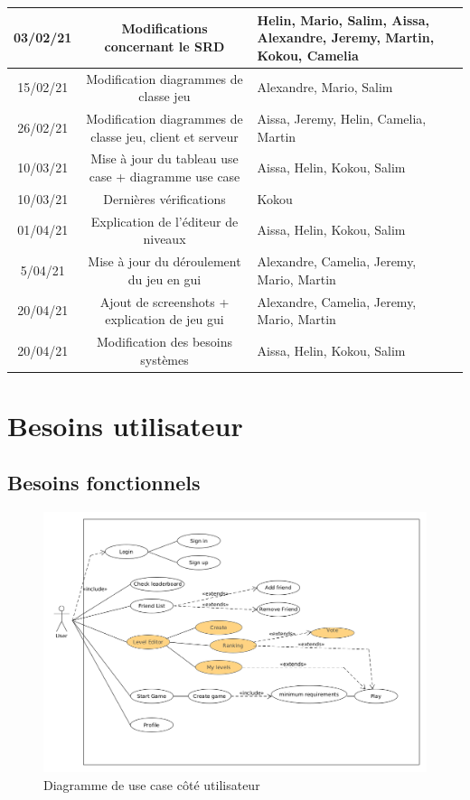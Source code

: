 \documentclass[a4paper,12pt]{article}
\begin{document}
\begin{tabularx}{16cm}{|c|c|X|}
	\hline
	    03/02/21 & Modifications concernant le SRD & Helin, Mario, Salim, Aissa,
		Alexandre, Jeremy, Martin, Kokou, Camelia\\
	\hline
	    15/02/21 & Modification diagrammes de classe jeu & Alexandre, Mario, Salim\\
	\hline
    	26/02/21 & Modification diagrammes de classe
	    jeu, client et serveur & Aissa, Jeremy, Helin, Camelia, Martin\\
	\hline
	    10/03/21 & Mise à jour du tableau use case + diagramme use case &  Aissa, Helin, Kokou, Salim\\
	\hline
	    10/03/21 & Dernières vérifications & Kokou\\
	\hline
	    01/04/21 & Explication de l'éditeur de niveaux & Aissa, Helin, Kokou, Salim\\
	\hline
	    5/04/21 & Mise à jour du déroulement du jeu en gui & Alexandre, Camelia, Jeremy, Mario, Martin\\
	\hline
	    20/04/21 & Ajout de screenshots + explication de jeu gui & Alexandre, Camelia, Jeremy, Mario, Martin\\
	\hline
		 20/04/21 & Modification des besoins systèmes &  Aissa, Helin, Kokou, Salim\\
	\hline
\end{tabularx}

\newpage

\section{Besoins utilisateur}

\subsection{Besoins fonctionnels}


\begin{figure}[h!]
\centering
\includegraphics[width=15cm]{images/UserUseCase.png}
\caption{Diagramme de use case côté utilisateur}
\label{fig:UserUseCase}
\end{figure}
\end{document}
